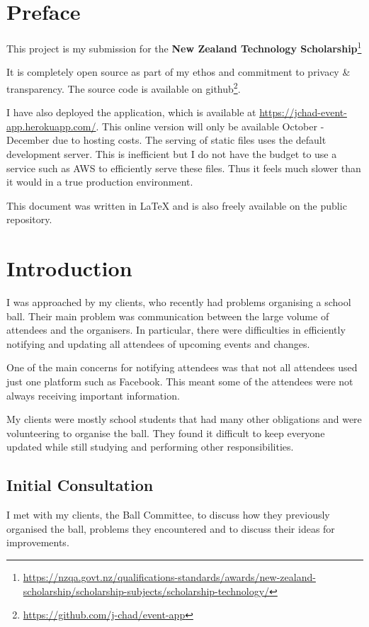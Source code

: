 \documentclass[a4paper,oneside,12pt,draft]{report}
\begin{document}
	\tableofcontents
	\pagebreak

	\chapter{Preface}
	This project is my submission for the \textbf{New Zealand Technology Scholarship}\footnote{\url{https://nzqa.govt.nz/qualifications-standards/awards/new-zealand-scholarship/scholarship-subjects/scholarship-technology/}}

	It is completely open source as part of my ethos and commitment to privacy \& transparency. The source code is available on github\footnote{\url{https://github.com/j-chad/event-app}}.
	
	I have also deployed the application, which is available at \url{https://jchad-event-app.herokuapp.com/}. This online version will only be available October - December due to hosting costs. The serving of static files uses the default development server. This is inefficient but I do not have the budget to use a service such as AWS to efficiently serve these files. Thus it feels much slower than it would in a true production environment.

	This document was written in \LaTeX{} and is also freely available on the public repository.


	\chapter{Introduction}
	I was approached by my clients, who recently had problems organising a school ball. Their main problem was communication between the large volume of attendees and the organisers. In particular, there were difficulties in efficiently notifying and updating all attendees of upcoming events and changes.

    One of the main concerns for notifying attendees was that not all attendees used just one platform such as Facebook. This meant some of the attendees were not always receiving important information.

    My clients were mostly school students that had many other obligations and were volunteering to organise the ball. They found it difficult to keep everyone updated while still studying and performing other responsibilities.

	\section{Initial Consultation}
	I met with my clients, the Ball Committee, to discuss how they previously organised the ball, problems they encountered and to discuss their ideas for improvements.
\end{document}
